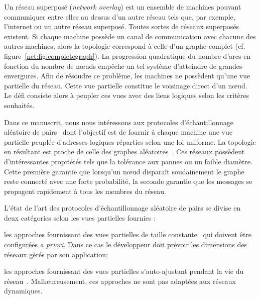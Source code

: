 Un réseau superposé (\emph{network overlay}) est un ensemble de machines pouvant
communiquer entre elles au dessus d'un autre réseau tels que, par exemple,
l'internet ou un autre réseau superposé.  Toutes sortes de réseaux superposés
existent. Si chaque machine possède un canal de communication avec chacune des
autres machines, alors la topologie correspond à celle d'un graphe complet
(cf. figure~\ref{net:fig:completegraph}). La progression quadratique du nombre
d'arcs en fonction du nombre de nœuds empêche un tel système d'atteindre de
grandes envergures. Afin de résoudre ce problème, les machines ne possèdent
qu'une vue partielle du réseau. Cette vue partielle constitue le voisinage
direct d'un nœud. Le défi consiste alors à peupler ces vues avec des liens
logiques selon les critères souhaités.

Dans ce manuscrit, nous nous intéressons aux protocoles d'échantillonnage
aléatoire de pairs~\cite{jelasity2007gossip} dont l'objectif est de fournir à
chaque machine une vue partielle peuplée d'adresses logiques réparties selon une
loi uniforme. La topologie en résultant est proche de celle des graphes
aléatoires~\cite{erdos1959random}. Ces réseaux possèdent d'intéressantes
propriétés tels que la tolérance aux pannes ou un faible diamètre. Cette
première garantie que lorsqu'un nœud disparaît soudainement le graphe reste
connecté avec une forte probabilité, la seconde garantie que les messages se
propagent rapidement à tous les membres du réseau.


L'état de l'art des protocoles d'échantillonnage aléatoire de pairs se divise en
deux catégories selon les vues partielles fournies :
\begin{inparaenum}[(i)]
\item les approches fournissant des vues partielles de taille
  constante~\cite{eugster2003lightweight, leitao2007dependable,
    tolgyeski2009adaptive, voulgaris2005cyclon} qui doivent être configurées
  \emph{a priori}. Dans ce cas le développeur doit prévoir les dimensions des
  réseaux gérés par son application;
\item les approches fournissant des vues partielles s'auto-ajustant pendant la
  vie du réseau~\cite{ganesh2001scamp, ganesh2003peer}. Malheureusement, ces
  approches ne sont pas adaptées aux réseaux dynamiques.
\end{inparaenum}

